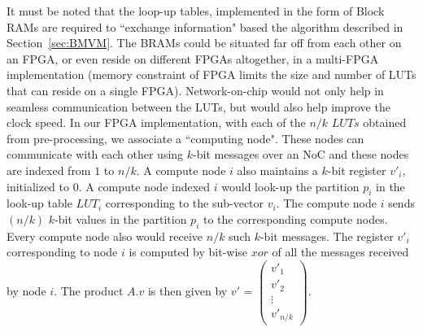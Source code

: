 \documentclass[conference, 9pt]{IEEEtran}
\begin{document}
It must be noted that the loop-up tables, implemented in the form of Block RAMs are required to ``exchange information" based the algorithm described in Section~\ref{sec:BMVM}. The BRAMs could be situated far off from each other on an FPGA, or even reside on different FPGAs altogether, in a multi-FPGA implementation (memory constraint of FPGA limits the size and number of LUTs that can reside on a single FPGA). Network-on-chip would not only help in seamless communication between the LUTs, but would also help improve the clock speed. In our FPGA implementation, with each of the $n/k$ $LUTs$ obtained from pre-processing, we associate a ``computing node". These nodes can communicate with each other using $k$-bit messages over an NoC and these nodes are indexed from $1$ to $n/k$. A compute node $i$ also maintains a $k$-bit register $v'_i$, initialized to $0$. A compute node indexed $i$ would look-up the partition $p_i$ in the look-up table $LUT_i$ corresponding to the sub-vector $v_i$. The compute node $i$ 
sends $(n/k)$ $k$-bit values in the partition $p_i$ to the corresponding compute nodes. Every compute node also would receive $n/k$ such $k$-bit messages. The register $v'_i$ corresponding to node $i$ is computed by bit-wise $xor$ of all the messages received by node $i$. The product $A.v$ is then given by $v'$ = $\begin{pmatrix}
    v'_1 \\
    v'_2 \\
    \vdots \\
    v'_{n/k}
\end{pmatrix}$. \\

\end{document}
